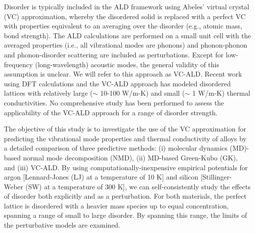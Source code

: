 Disorder is typically included in the ALD framework using Abeles' 
virtual crystal (VC) approximation, whereby the disordered  
solid is replaced with a perfect VC with properties 
equivalent to an averaging over the disorder 
(e.g., atomic mass, bond strength).\cite{abeles_lattice_1963}
The ALD calculations are performed on a small 
unit cell with the averaged properties 
(i.e., all vibrational modes are phonons) and 
phonon-phonon and phonon-disorder scattering 
are included as perturbations.
\cite{abeles_lattice_1963,tamura_isotope_1983,garg_role_2011,
tian_phonon_2012,lindsay_thermal_2012} 
Except for low-frequency (long-wavelength) acoustic modes,
the general validity of this assumption is unclear. 
We will refer to this approach as VC-ALD. 
Recent work using DFT calculations and the VC-ALD approach has 
modeled disordered lattices with relatively large 
($\sim$ 10-100 W/m-K)
\cite{garg_role_2011,lindsay_thermal_2012,li_thermal_2012} and 
small ($\sim$ 1 W/m-K)\cite{tian_phonon_2012} 
thermal conductivities. No comprehensive study has 
been performed to assess the applicability of the VC-ALD approach for a 
range of disorder strength.

The objective of this study is to investigate the use of the VC 
approximation for predicting the vibrational mode properties and 
thermal conductivity of alloys by a detailed comparison 
of three predictive methods: (i) molecular dynamics (MD)-based 
normal mode decomposition (NMD), (ii) MD-based Green-Kubo (GK), 
and (iii) VC-ALD. By using computationally-inexpensive  
empirical potentials for argon [Lennard-Jones (LJ) at a temperature of 10 K]
\cite{ashcroft_solid_1976} 
and silicon [Stillinger-Weber (SW) at a temperature of 300 K],
\cite{stillinger_computer_1985}   
we can self-consistently study the effects of disorder both explicitly 
and as a perturbation. For both materials, the perfect lattice is 
disordered with a heavier mass species up to equal 
concentration, spanning 
a range of small to large disorder. By spanning this range, 
the limits of the perturbative models are examined.

